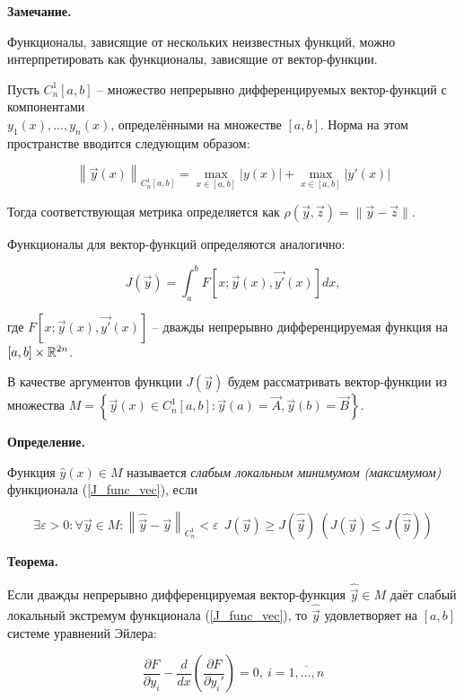 \textbf{Замечание.}

Функционалы, зависящие от нескольких неизвестных функций, можно
интерпретировать как функционалы, зависящие от вектор-функции.

Пусть $C_n^1 [a, b]$ -- множество непрерывно дифференцируемых
вектор-функций с компонентами \\
$y_1(x), \dots, y_n(x)$, определёнными на
множестве $[a, b]$. Норма на этом пространстве вводится следующим образом:

$$
\left\| \Vec{y}(x) \right\|_{C_n^1 [a, b]} = 
\max_{x \in [a, b]} |y(x)| + \max_{x \in [a, b]} |y'(x)|
$$

Тогда соответствующая метрика определяется как
$\rho(\Vec{y}, \Vec{z}) = \| \Vec{y} - \Vec{z} \|$.

Функционалы для вектор-функций определяются аналогично:

\begin{equation}\label{J_func_vec}
J(\Vec{y}) = \int_a^b F \left[ x; \Vec{y}(x), \Vec{y'}(x) \right] dx,
\end{equation}

где $F \left[ x; \Vec{y}(x), \Vec{y'}(x) \right]$ --
дважды непрерывно дифференцируемая функция на $[a, b] \times \mathbb{R}^{2n}$.

В качестве аргументов функции $J(\Vec{y})$ будем
рассматривать вектор-функции из множества 
$M = \left\{ \Vec{y}(x) \in C_n^1 [a, b] : 
\Vec{y}(a) = \Vec{A}, \Vec{y}(b) = \Vec{B} \right\}$.

\textbf{Определение.}

Функция $\widehat{y}(x) \in M$ называется 
\textit{слабым локальным минимумом (максимумом)} 
функционала (\ref{J_func_vec}), если

$$
\exists \varepsilon > 0 : \forall \Vec{y} \in M :
\left\| \widehat{\Vec{y}} - \Vec{y} \right\|_{C_n^1} < \varepsilon
\ \ J(\Vec{y}) \geqslant J (\widehat{\Vec{y}})
\ \left( J(\Vec{y}) \leqslant J (\widehat{\Vec{y}}) \right)
$$

\textbf{Теорема.}

Если дважды непрерывно дифференцируемая вектор-функция 
$\widehat{\Vec{y}} \in M$ даёт слабый локальный экстремум
функционала (\ref{J_func_vec}), то $\widehat{\Vec{y}}$
удовлетворяет на $[a, b]$ системе уравнений Эйлера:

\begin{equation}
\frac{\partial F}{\partial y_i} 
- \frac{d}{dx} \left( \frac{\partial F}{\partial y_i'} \right) = 0,
\ i = \overline{1, \dots, n}
\end{equation}

